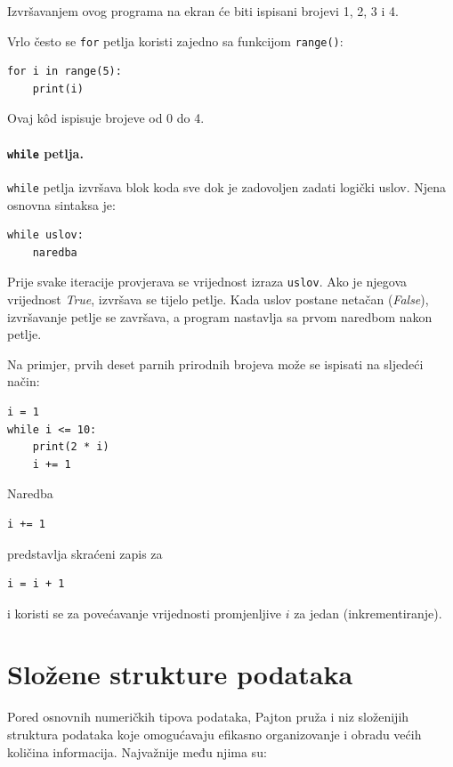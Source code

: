 Izvršavanjem ovog programa na ekran će biti ispisani brojevi 1, 2, 3 i 4.

Vrlo često se \texttt{for} petlja koristi zajedno sa funkcijom \texttt{range()}:

\begin{verbatim}
for i in range(5):
    print(i)
\end{verbatim}

Ovaj k\^od ispisuje brojeve od 0 do 4.

\paragraph{\texttt{while} petlja.} \texttt{while} petlja izvršava blok koda sve dok je zadovoljen zadati logički uslov. Njena osnovna sintaksa je:

\begin{verbatim}
while uslov:
    naredba
\end{verbatim}

Prije svake iteracije provjerava se vrijednost izraza \texttt{uslov}. Ako je njegova vrijednost \emph{True}, izvršava se tijelo petlje. Kada uslov postane netačan (\emph{False}), izvršavanje petlje se završava, a program nastavlja sa prvom naredbom nakon petlje.

Na primjer, prvih deset parnih prirodnih brojeva može se ispisati na sljedeći način:

\begin{verbatim}
i = 1
while i <= 10:
    print(2 * i)
    i += 1
\end{verbatim}

Naredba
\begin{verbatim}
i += 1
\end{verbatim}
predstavlja skraćeni zapis za

\begin{verbatim}
i = i + 1
\end{verbatim}

i koristi se za povećavanje vrijednosti promjenljive $i$  za jedan (inkrementiranje).

\section{Složene strukture podataka}

Pored osnovnih numeričkih tipova podataka, Pajton pruža i niz složenijih struktura podataka koje omogućavaju efikasno organizovanje i obradu većih količina informacija. Najvažnije među njima su:

